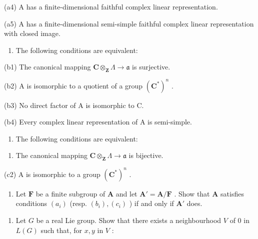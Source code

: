 (a4) A has a finite-dimensional faithful complex linear representation.

(a5) A has a finite-dimensional semi-simple faithful complex linear representation with closed image.

\begin{enumerate}
\def\labelenumi{(\alph{enumi})}
\setcounter{enumi}{1}
\tightlist
\item
  The following conditions are equivalent:
\end{enumerate}

(b1) The canonical mapping \(\mathbf{C} \otimes_{\mathbf{Z}} \Lambda \to \mathfrak{a}\) is surjective.

(b2) A is isomorphic to a quotient of a group \((\mathbf{C}^{*})^{n}\) .

(b3) No direct factor of A is isomorphic to C.

(b4) Every complex linear representation of A is semi-simple.

\begin{enumerate}
\def\labelenumi{(\alph{enumi})}
\setcounter{enumi}{2}
\tightlist
\item
  The following conditions are equivalent:
\end{enumerate}

\begin{enumerate}
\def\labelenumi{(\roman{enumi})}
\setcounter{enumi}{149}
\tightlist
\item
  The canonical mapping \(\mathbf{C} \otimes_{\mathbf{Z}} \Lambda \to \mathfrak{a}\) is bijective.
\end{enumerate}

(c2) A is isomorphic to a group \((\mathbf{C}^{*})^{n}\) .

\begin{enumerate}
\def\labelenumi{(\alph{enumi})}
\setcounter{enumi}{3}
\tightlist
\item
  Let \(\mathbf{F}\) be a finite subgroup of \(\mathbf{A}\) and let \(\mathbf{A}' = \mathbf{A} / \mathbf{F}\) . Show that \(\mathbf{A}\) satisfies conditions \((a_i)\) (resp. \((b_i), (c_i)\) ) if and only if \(\mathbf{A}'\) does.
\end{enumerate}

\begin{enumerate}
\def\labelenumi{\arabic{enumi}.}
\setcounter{enumi}{18}
\tightlist
\item
  Let \(G\) be a real Lie group. Show that there exists a neighbourhood \(V\) of 0 in \(L(G)\) such that, for \(x, y\) in \(V\) :
\end{enumerate}

